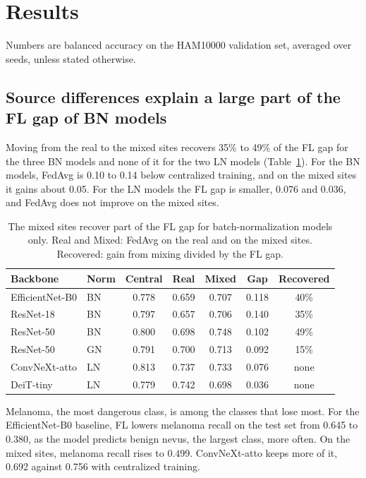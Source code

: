 \documentclass[10pt,twocolumn,a4paper]{article}
\begin{document}
\section{Results}
Numbers are balanced accuracy on the HAM10000 validation set, averaged over seeds, unless stated otherwise.

\subsection{Source differences explain a large part of the FL gap of BN models}
Moving from the real to the mixed sites recovers 35\% to 49\% of the FL gap for the three BN models and none of it for the two LN models (Table~\ref{tab:dev}). For the BN models, FedAvg is 0.10 to 0.14 below centralized training, and on the mixed sites it gains about 0.05. For the LN models the FL gap is smaller, 0.076 and 0.036, and FedAvg does not improve on the mixed sites.

\begin{table}[t]
\caption{The mixed sites recover part of the FL gap for batch-normalization models only. Real and Mixed: FedAvg on the real and on the mixed sites. Recovered: gain from mixing divided by the FL gap.}\label{tab:dev}
\centering\footnotesize\setlength{\tabcolsep}{3.2pt}
\begin{tabular}{llccccc}
\toprule
Backbone & Norm & Central & Real & Mixed & Gap & Recovered \\
\midrule
EfficientNet-B0 & BN & 0.778 & 0.659 & 0.707 & 0.118 & 40\% \\
ResNet-18 & BN & 0.797 & 0.657 & 0.706 & 0.140 & 35\% \\
ResNet-50 & BN & 0.800 & 0.698 & 0.748 & 0.102 & 49\% \\
ResNet-50 & GN & 0.791 & 0.700 & 0.713 & 0.092 & 15\% \\
ConvNeXt-atto & LN & 0.813 & 0.737 & 0.733 & 0.076 & none \\
DeiT-tiny & LN & 0.779 & 0.742 & 0.698 & 0.036 & none \\
\bottomrule
\end{tabular}
\end{table}

Melanoma, the most dangerous class, is among the classes that lose most. For the EfficientNet-B0 baseline, FL lowers melanoma recall on the test set from 0.645 to 0.380, as the model predicts benign nevus, the largest class, more often. On the mixed sites, melanoma recall rises to 0.499. ConvNeXt-atto keeps more of it, 0.692 against 0.756 with centralized training.
\end{document}
